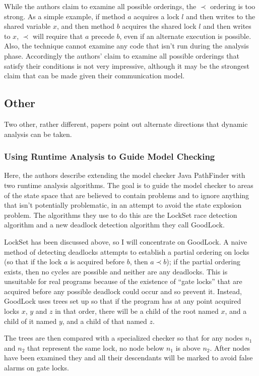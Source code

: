 \documentclass{article}
\begin{document}
\begin{multicols}{2}
While the authors claim to examine all possible orderings, the $\prec$
ordering is too strong.  As a simple example, if method $a$ acquires a
lock $l$ and then writes to the shared variable $x$, and then method
$b$ acquires the shared lock $l$ and then writes to $x$, $\prec$ will
require that $a$ precede $b$, even if an alternate execution is
possible.  Also, the technique cannot examine any code that isn't run
during the analysis phase.  Accordingly the authors' claim to examine
all possible orderings that satisfy their conditions is not very
impressive, although it may be the strongest claim that can be made
given their communication model.

\subsection{Other}

Two other, rather different, papers point out alternate directions
that dynamic analysis can be taken.

\subsubsection{Using Runtime Analysis to Guide Model Checking~\cite{havelund00using}}

Here, the authors describe extending the model checker Java PathFinder
with two runtime analysis algorithms.  The goal is to guide the model
checker to areas of the state space that are believed to contain
problems and to ignore anything that isn't potentially problematic, in
an attempt to avoid the state explosion problem.  The algorithms they
use to do this are the LockSet race detection algorithm and a new
deadlock detection algorithm they call GoodLock.

LockSet has been discussed above, so I will concentrate on GoodLock.
A naive method of detecting deadlocks attempts to establish a partial
ordering on locks (so that if the lock $a$ is acquired before $b$,
then $a \prec b$); if the partial ordering exists, then no cycles are
possible and neither are any deadlocks.  This is unsuitable for real
programs because of the existence of ``gate locks'' that are acquired
before any possible deadlock could occur and so prevent it.  Instead,
GoodLock uses trees set up so that if the program has at any point
acquired locks $x$, $y$ and $z$ in that order, there will be a child
of the root named $x$, and a child of it named $y$, and a child of
that named $z$.

The trees are then compared with a specialized checker so that for any
nodes $n_1$ and $n_2$ that represent the same lock, no node below
$n_1$ is above $n_2$.  After nodes have been examined they and all
their descendants will be marked to avoid false alarms on gate locks.


\end{multicols}
\end{document}
